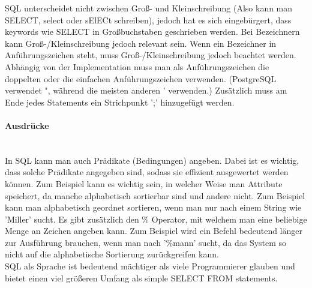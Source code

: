 \documentclass{article}
\newcommand{\paragraphlb}[1]{\paragraph{#1}\mbox{}\\}
\begin{document}
 	SQL unterscheidet nicht zwischen Groß- und Kleinschreibung (Also kann man SELECT, select oder sElECt schreiben), jedoch hat es sich eingebürgert, dass keywords wie SELECT in Großbuchstaben geschrieben werden. Bei Bezeichnern kann Groß-/Kleinschreibung jedoch relevant sein. Wenn ein Bezeichner in Anführungszeichen steht, muss Groß-/Kleinschreibung jedoch beachtet werden. Abhängig von der Implementation muss man als Anführungszeichen die doppelten oder die einfachen Anführungszeichen verwenden. (PostgreSQL verwendet ", während die meisten anderen ' verwenden.) Zusätzlich muss am Ende jedes Statements ein Strichpunkt ';' hinzugefügt werden. \\
 	\paragraphlb{Ausdrücke}
 	In SQL kann man auch Prädikate (Bedingungen) angeben. Dabei ist es wichtig, dass solche Prädikate angegeben sind, sodass sie effizient ausgewertet werden können. Zum Beispiel kann es wichtig sein, in welcher Weise man Attribute speichert, da manche alphabetisch sortierbar sind und andere nicht. Zum Beispiel kann man alphabetisch geordnet sortieren, wenn man nur nach einem String wie 'Miller' sucht. Es gibt zusätzlich den \% Operator, mit welchem man eine beliebige Menge an Zeichen angeben kann. Zum Beispiel wird ein Befehl bedeutend länger zur Ausführung brauchen, wenn man nach '\%mann' sucht, da das System so nicht auf die alphabetische Sortierung zurückgreifen kann. \\
 	SQL als Sprache ist bedeutend mächtiger als viele Programmierer glauben und bietet einen viel größeren Umfang als simple SELECT FROM statements.
\end{document}

